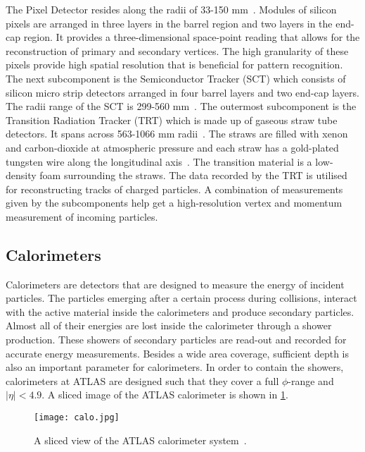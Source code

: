 The Pixel Detector resides along the radii of 33-150 mm~\cite{Aaboud_2017}. Modules of silicon pixels 
are arranged in three layers in the barrel region and two layers in the end-cap region. 
It provides a three-dimensional space-point reading that allows for the reconstruction of primary and 
secondary vertices. The high granularity of these pixels provide high spatial 
resolution that is beneficial for pattern recognition. The next subcomponent is the Semiconductor 
Tracker (SCT) which consists of silicon micro strip detectors 
arranged in four barrel layers and two end-cap layers. The radii range of the SCT is 299-560 mm~\cite{Aaboud_2017}. The 
outermost subcomponent is the Transition Radiation Tracker (TRT) which 
is made up of gaseous straw tube detectors. It spans across 563-1066 mm radii~\cite{Aaboud_2017}. The straws are filled 
with xenon and carbon-dioxide at atmospheric pressure and each straw
has a gold-plated tungsten wire along the longitudinal axis~\cite{VOGEL2013277}. The transition material is a low-density 
foam surrounding the straws. The data recorded by the TRT is utilised for reconstructing 
tracks of charged particles. A combination of measurements given by the subcomponents help get a high-resolution vertex and 
momentum measurement of incoming particles. 

\subsection{Calorimeters}
Calorimeters are detectors that are designed to measure the energy of incident particles.
The particles emerging after a certain process during collisions, interact with 
the active material inside the calorimeters and produce secondary particles. Almost all of
their energies are lost inside the calorimeter through a shower production.
These showers of secondary particles are read-out and recorded for accurate energy 
measurements. Besides a wide area coverage, sufficient depth is also an important 
parameter for calorimeters. In order to contain the showers, calorimeters at ATLAS are 
designed such that they cover a full $\phi$-range and $|\eta|<4.9$. A sliced image of the ATLAS calorimeter
is shown in \cref{fig:calo}.  

\begin{figure}[htbp]
    \centering
    \texttt{[image: calo.jpg]}
    \caption[Sketch of the ATLAS calorimeters]{A sliced view of the ATLAS calorimeter system~\cite{Pequenao:1095927}.}%
    \label{fig:calo}
\end{figure}

